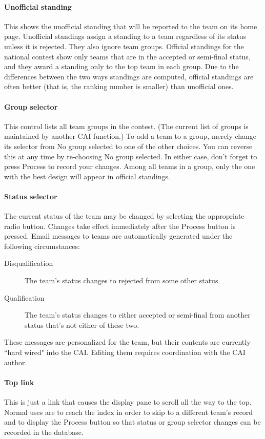 \documentclass[11pt,letterpaper]{refart}
\def\ui#1{\textsf{#1}}
\begin{document}
\paragraph{Unofficial standing}
This shows the unofficial standing that will be reported to the team
on its home page. Unofficial standings assign a standing to a team
regardless of its status unless it is rejected. They also ignore team
groups. Official standings for the national contest show only teams
that are in the accepted or semi-final status, and they award a
standing only to the top team in each group. Due to the differences
between the two ways standings are computed, official standings are
often better (that is, the ranking number is smaller) than unofficial
ones.

\paragraph{Group selector}
This control lists all team groups in the contest. (The current list
of groups is maintained by another CAI function.)  To add a team to a
group, merely change its selector from \ui{No group selected} to one
of the other choices. You can reverse this at any time by re-choosing
\ui{No group selected}. In either case, don't forget to press
\ui{Process} to record your changes. Among all teams in a group, only
the one with the best design will appear in official standings.

\paragraph{Status selector}
The current status of the team may be changed by selecting the
appropriate radio button. Changes take effect immediately after the
\ui{Process} button is pressed. Email messages to teams are
automatically generated under the following circumstances:
\begin{description}
\item[Disqualification] The team's status changes to rejected from some other status.
\item[Qualification] The team's status changes to either accepted or
semi-final from another status that's not either of these two.
\end{description}
These messages are personalized for the team, but their contents are currently
``hard wired" into the CAI. Editing them requires coordination with the CAI 
author.

\paragraph{Top link}
This is just a link that causes the display pane to scroll all the way
to the top.  Normal uses are to reach the index in order to skip to a
different team's record and to display the \ui{Process} button so that
status or group selector changes can be recorded in the database.
\end{document}
